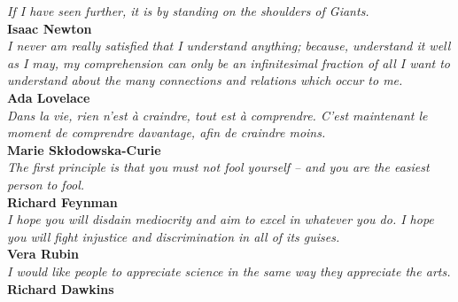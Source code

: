 \vspace{10cm}
\vfill
\hspace{5cm}
\parbox{12cm}{\Large%
	\textit{\textsf{If I have seen further, it is by standing on the shoulders of Giants.}}\\[10pt]
	\textbf{\textsf{Isaac Newton}}\\[40pt]
	\textit{\textsf{I never am really satisfied that I understand anything; because, understand it well as I may, my comprehension can only be an infinitesimal fraction of all I want to understand about the many connections and relations which occur to me.}}\\[10pt]
	\textbf{\textsf{Ada Lovelace}}\\[40pt]
	\textit{\textsf{Dans la vie, rien n'est à craindre, tout est à comprendre.  C'est maintenant le moment de comprendre davantage, afin de craindre moins.}}\\[10pt]
	\textbf{\textsf{Marie Skłodowska-Curie}}\\[40pt]
	\textit{\textsf{The first principle is that you must not fool yourself -- and you are the easiest person to fool.}}\\[10pt]
	\textbf{\textsf{Richard Feynman}}\\[40pt]
	\textit{\textsf{I hope you will disdain mediocrity and aim to excel in whatever you do. I hope you will fight injustice and discrimination in all of its guises.}}\\[10pt]
	\textbf{\textsf{Vera Rubin}}\\[40pt]
	\textit{\textsf{I would like people to appreciate science in the same way they appreciate the arts.}}\\[10pt]
	\textbf{\textsf{Richard Dawkins}}
}
